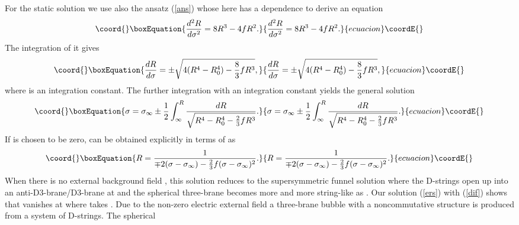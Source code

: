 \documentclass[12pt,a4paper]{article}
\begin{document}
For the static solution we use also the ansatz (\ref{ans}) whose \coordHE{} here
has a \myHighlight{$\sigma$}\coordHE{} dependence to derive an equation
\begin{equation}\coord{}\boxEquation{
\frac{d^2R}{d\sigma^2} = 8R^3 - 4fR^2.
}{
\frac{d^2R}{d\sigma^2} = 8R^3 - 4fR^2.
}{ecuacion}\coordE{}\end{equation}
The integration of it gives
\begin{equation}\coord{}\boxEquation{
\frac{dR}{d\sigma} = \pm \sqrt{4(R^4 - R_0^4) - \frac{8}{3}fR^3},
\label{dif}}{
\frac{dR}{d\sigma} = \pm \sqrt{4(R^4 - R_0^4) - \frac{8}{3}fR^3},
}{ecuacion}\coordE{}\end{equation}
where \coordHE{} is an integration constant. The further integration with an
integration constant \myHighlight{$\sigma_{\infty}$}\coordHE{} yields the general solution
\begin{equation}\coord{}\boxEquation{
\sigma = \sigma_{\infty} \pm \frac{1}{2}\int_{\infty}^{R} \frac{dR}
{\sqrt{R^4-R_0^4 - \frac{2}{3}fR^3}}.
\label{ges}}{
\sigma = \sigma_{\infty} \pm \frac{1}{2}\int_{\infty}^{R} \frac{dR}
{\sqrt{R^4-R_0^4 - \frac{2}{3}fR^3}}.
}{ecuacion}\coordE{}\end{equation}
If \coordHE{} is chosen to be zero, \coordHE{} can be obtained explicitly in
terms of \myHighlight{$\sigma$}\coordHE{} as
\begin{equation}\coord{}\boxEquation{
R = \frac{1}{\mp2(\sigma - \sigma_{\infty}) - \frac{2}{3}
f(\sigma - \sigma_{\infty})^2}.
\label{ers}}{
R = \frac{1}{\mp2(\sigma - \sigma_{\infty}) - \frac{2}{3}
f(\sigma - \sigma_{\infty})^2}.
}{ecuacion}\coordE{}\end{equation}
When there is no external background field \coordHE{}, 
this solution reduces to the
supersymmetric funnel solution where the D-strings open up into an
anti-D3-brane/D3-brane at \myHighlight{$\sigma = \sigma_{\infty}$}\coordHE{} and the spherical
three-brane becomes more and more string-like as \myHighlight{$\sigma \rightarrow
\mp \infty$}\coordHE{} \cite{CMT}. Our solution (\ref{ers}) with (\ref{dif})
shows that \coordHE{} vanishes at \coordHE{} where \coordHE{} takes \coordHE{}. Due to the non-zero electric external field
a three-brane bubble with a noncommutative \coordHE{} structure is
produced from a system of \coordHE{} D-strings. The spherical 
\end{document}
